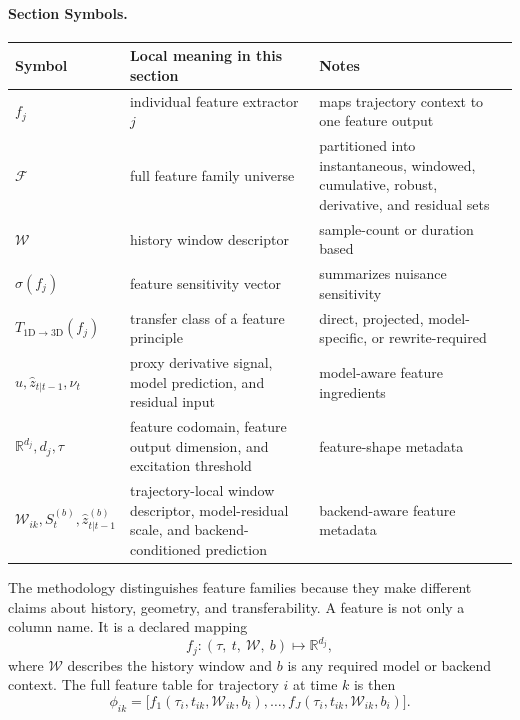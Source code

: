 \documentclass[11pt]{article}
\newcommand{\sectionsymbol}[3]{#1 & #2 & #3 \\}
\newcommand{\sectionsymbols}[1]{%
\begin{center}
\small
\setlength{\tabcolsep}{4pt}
\begin{tabularx}{0.95\textwidth}{>{\raggedright\arraybackslash}p{0.16\textwidth}X>{\raggedright\arraybackslash}p{0.18\textwidth}}
\toprule
Symbol & Local meaning in this section & Notes \\
\midrule
#1
\bottomrule
\end{tabularx}
\end{center}
}
\begin{document}
\paragraph{Section Symbols.}
\sectionsymbols{
\sectionsymbol{\(f_j\)}{individual feature extractor \(j\)}{maps trajectory context to one feature output}
\sectionsymbol{\(\mathcal{F}\)}{full feature family universe}{partitioned into instantaneous, windowed, cumulative, robust, derivative, and residual sets}
\sectionsymbol{\(\mathcal{W}\)}{history window descriptor}{sample-count or duration based}
\sectionsymbol{\(\sigma(f_j)\)}{feature sensitivity vector}{summarizes nuisance sensitivity}
\sectionsymbol{\(T_{1\mathrm{D}\rightarrow 3\mathrm{D}}(f_j)\)}{transfer class of a feature principle}{direct, projected, model-specific, or rewrite-required}
\sectionsymbol{\(\hat{u}, \hat{z}_{t|t-1}, \nu_t\)}{proxy derivative signal, model prediction, and residual input}{model-aware feature ingredients}
\sectionsymbol{\(\mathbb{R}^{d_j}, d_j, \tau\)}{feature codomain, feature output dimension, and excitation threshold}{feature-shape metadata}
\sectionsymbol{\(\mathcal{W}_{ik}, S_t^{(b)}, \hat{z}_{t|t-1}^{(b)}\)}{trajectory-local window descriptor, model-residual scale, and backend-conditioned prediction}{backend-aware feature metadata}
}

\noindent
The methodology distinguishes feature families because they make different
claims about history, geometry, and transferability. A feature is not only a
column name. It is a declared mapping
\begin{equation}
f_j :
(\tau,\ t,\ \mathcal{W},\ b)
\mapsto
\mathbb{R}^{d_j},
\end{equation}
where \(\mathcal{W}\) describes the history window and \(b\) is any required
model or backend context. The full feature table for trajectory \(i\) at time
\(k\) is then
\begin{equation}
\phi_{ik}
=
\bigl[
f_1(\tau_i,t_{ik},\mathcal{W}_{ik},b_i),\dots,f_J(\tau_i,t_{ik},\mathcal{W}_{ik},b_i)
\bigr].
\end{equation}
\end{document}
